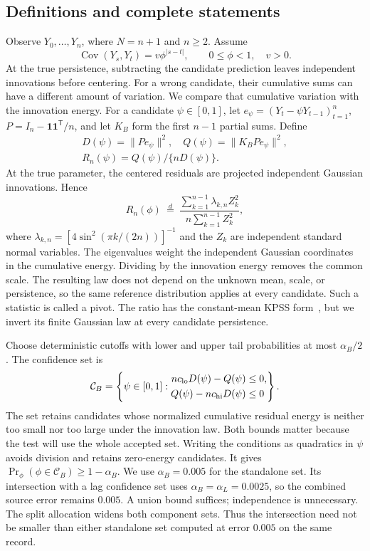 \subsection*{Definitions and complete statements}
Observe $Y_0,\ldots,Y_n$, where $N=n+1$ and $n\ge2$. Assume
\[
 \operatorname{Cov}(Y_s,Y_t)=v\phi^{|s-t|},\qquad
 0\le\phi<1,\quad v>0.
\]
At the true persistence, subtracting the candidate prediction leaves independent innovations before centering. For a wrong candidate, their cumulative sums can have a different amount of variation. We compare that cumulative variation with the innovation energy. For a candidate $\psi\in[0,1]$, let $e_\psi=(Y_t-\psi Y_{t-1})_{t=1}^n$, $P=I_n-\mathbf1\mathbf1^{\mathsf T}/n$, and let $K_B$ form the first $n-1$ partial sums. Define
\begin{equation}\label{src16:pivot}
 \begin{gathered}
 D(\psi)=\|Pe_\psi\|^2,\quad Q(\psi)=\|K_BPe_\psi\|^2,\\
 R_n(\psi)=Q(\psi)/\{nD(\psi)\}.
 \end{gathered}
\end{equation}
At the true parameter, the centered residuals are projected independent Gaussian innovations. Hence
\begin{equation}\label{src16:law}
 R_n(\phi)\ \overset{d}{=}\
 \frac{\sum_{k=1}^{n-1}\lambda_{k,n}Z_k^2}
 {n\sum_{k=1}^{n-1}Z_k^2},
\end{equation}
where $\lambda_{k,n}=[4\sin^2(\pi k/(2n))]^{-1}$ and the $Z_k$ are independent standard normal variables. The eigenvalues weight the independent Gaussian coordinates in the cumulative energy. Dividing by the innovation energy removes the common scale. The resulting law does not depend on the unknown mean, scale, or persistence, so the same reference distribution applies at every candidate. Such a statistic is called a pivot. The ratio has the constant-mean KPSS form~\cite{kpss1992}, but we invert its finite Gaussian law at every candidate persistence.

Choose deterministic cutoffs with lower and upper tail probabilities at most $\alpha_B/2$. The confidence set is
\begin{equation}\label{src16:set}
 \mathcal C_B=\left\{\psi\in[0,1]:
 \begin{aligned}
 n c_{\rm lo}D(\psi)-Q(\psi)&\le0,\\
 Q(\psi)-n c_{\rm hi}D(\psi)&\le0
 \end{aligned}\right\}.
\end{equation}
The set retains candidates whose normalized cumulative residual energy is neither too small nor too large under the innovation law. Both bounds matter because the test will use the whole accepted set. Writing the conditions as quadratics in $\psi$ avoids division and retains zero-energy candidates. It gives $\Pr_\phi(\phi\in\mathcal C_B)\ge1-\alpha_B$. We use $\alpha_B=0.005$ for the standalone set. Its intersection with a lag confidence set uses $\alpha_B=\alpha_L=0.0025$, so the combined source error remains $0.005$. A union bound suffices; independence is unnecessary. The split allocation widens both component sets. Thus the intersection need not be smaller than either standalone set computed at error $0.005$ on the same record.

